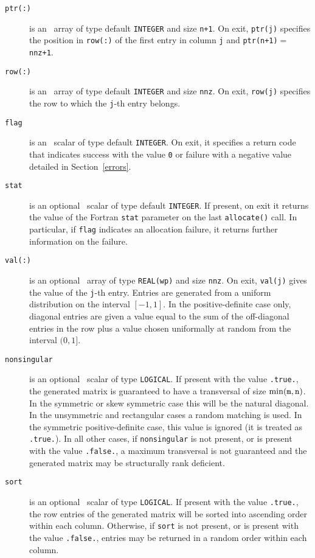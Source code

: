 \begin{description}
\item[\texttt{ptr(:)}] is an \intentout\ array of type default {\tt INTEGER}
   and size {\tt n+1}. On exit, {\tt ptr(j)} specifies the position in {\tt row(:)}
   of the first entry in column {\tt j} and {\tt ptr(n+1)$=$nnz+1}.

\item[\texttt{row(:)}] is an \intentout\ array of type default {\tt INTEGER}
   and size {\tt nnz}. On exit, {\tt row(j)} specifies the row to which the
   {\tt j}-th entry belongs.

\item[\texttt{flag}] is an \intentout\ scalar of type default {\tt INTEGER}.
   On exit, it specifies a return code that indicates success with the value
   {\tt 0} or failure with a negative value detailed in Section~\ref{errors}.

\item[\texttt{stat}] is an optional \intentout\ scalar of type default
   {\tt INTEGER}. If present, on exit it returns the value of the Fortran
   \texttt{stat} parameter on the last \texttt{allocate()} call. In particular,
   if \texttt{flag} indicates an allocation failure, it returns further
   information on the failure.

\item[\texttt{val(:)}] is an optional \intentout\ array of type
   {\tt REAL(wp)} and size \texttt{nnz}. On exit, \texttt{val(j)} gives
   the value of the \texttt{j}-th entry. Entries are generated from a uniform
   distribution on the interval $[-1,1]$. In the positive-definite case only,
   diagonal entries are given a value equal to the sum of the off-diagonal
   entries in the row plus a value chosen uniformally at random from the
   interval $(0,1]$.

\item[\texttt{nonsingular}] is an optional \intentin\ scalar of type
   {\tt LOGICAL}. If present with the value {\tt .true.}, the generated matrix
   is guaranteed to have a transversal of size $\min({\tt m}, {\tt n})$. In
   the symmetric or skew symmetric case this will be the natural diagonal. In
   the unsymmetric and rectangular cases a random matching is used. In the
   symmetric positive-definite case, this value is ignored (it is treated as
   {\tt.true.}).
   In all other cases, if {\tt nonsingular} is not present, or is present with
   the value {\tt .false.}, a maximum transversal is not guaranteed and the
   generated matrix may be structurally rank deficient.

\item[\texttt{sort}] is an optional \intentin\ scalar of type {\tt LOGICAL}. If
   present with the value {\tt .true.}, the row entries of the generated matrix
   will be sorted into ascending order within each column.
   Otherwise, if {\tt sort} is not present, or is present with the value
   {\tt .false.}, entries may be returned in a random order within each column.

\end{description}

